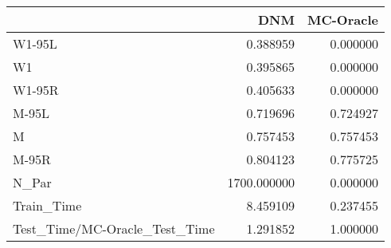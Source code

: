 \begin{tabular}{lrr}
\toprule
{} &          DNM &  MC-Oracle \\
\midrule
W1-95L                        &     0.388959 &   0.000000 \\
W1                            &     0.395865 &   0.000000 \\
W1-95R                        &     0.405633 &   0.000000 \\
M-95L                         &     0.719696 &   0.724927 \\
M                             &     0.757453 &   0.757453 \\
M-95R                         &     0.804123 &   0.775725 \\
N\_Par                         &  1700.000000 &   0.000000 \\
Train\_Time                    &     8.459109 &   0.237455 \\
Test\_Time/MC-Oracle\_Test\_Time &     1.291852 &   1.000000 \\
\bottomrule
\end{tabular}
